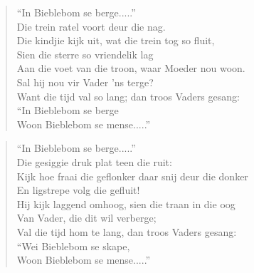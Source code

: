 \begin{verse}
``In Bieblebom se berge.....'' \\ 
Die trein ratel voort deur die nag. \\ 
Die kindjie kijk uit, wat die trein tog so fluit, \\ 
Sien die sterre so vriendelik lag \\ 
Aan die voet van die troon, waar Moeder nou woon. \\ 
Sal hij nou vir Vader ’ns terge? \\ 
Want die tijd val so lang; dan troos Vaders gesang: \\ 
``In Bieblebom se berge \\ 
Woon Bieblebom se mense.....'' \\ 
\end{verse}

\begin{verse}
``In Bieblebom se berge.....'' \\ 
Die gesiggie druk plat teen die ruit: \\ 
Kijk hoe fraai die geflonker daar snij deur die donker \\ 
En ligstrepe volg die gefluit! \\ 
Hij kijk laggend omhoog, sien die traan in die oog \\ 
Van Vader, die dit wil verberge; \\ 
Val die tijd hom te lang, dan troos Vaders gesang: \\ 
``Wei Bieblebom se skape, \\ 
Woon Bieblebom se mense.....'' \\ 
\end{verse}